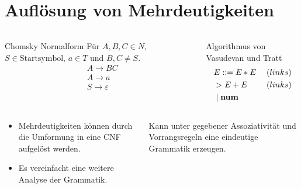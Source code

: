 \documentclass[t]{beamer}
\renewcommand{\Coloneqq}{\mathrel{\mathop{::}}=}
\begin{document}
	\section{Auflösung von Mehrdeutigkeiten}\label{sec:auflsung-von-mehrdeutigkeiten}
	\begin{frame}
		\vspace{-1em}
		\begin{columns}[T]
			\begin{block}{Chomsky Normalform}
				Für $A,B,C \in N$, $S \in \text{Startsymbol}$, $a \in T$ und $B,C \neq S$. \\
				\begin{align*}
					& A \rightarrow BC \\
					& A \rightarrow a \\
					& S \rightarrow \varepsilon
				\end{align*}
			\end{block}
			\begin{block}{Algorithmus von Vasudevan und Tratt}
				\begin{align*}
					& E \Coloneqq E * E \phantom{|} & (links) \\
					& > E + E & (links) \\
					& \phantom{|} | \phantom{|} \bold{num}
				\end{align*}
			\end{block}
		\end{columns}
		\vspace{1em}
		\begin{columns}[T]
			\begin{exampleblock}{}
				\begin{itemize}
					\item Mehrdeutigkeiten können durch die Umformung in eine CNF aufgelöst werden.\cite{kemp1974}
					\item Es vereinfacht eine weitere Analyse der Grammatik.
				\end{itemize}
			\end{exampleblock}
			\begin{exampleblock}{}
				Kann unter gegebener Assoziativität und Vorrangsregeln eine eindeutige Grammatik erzeugen. \cite{springer2013}
			\end{exampleblock}
		\end{columns}
	\end{frame}
\end{document}
